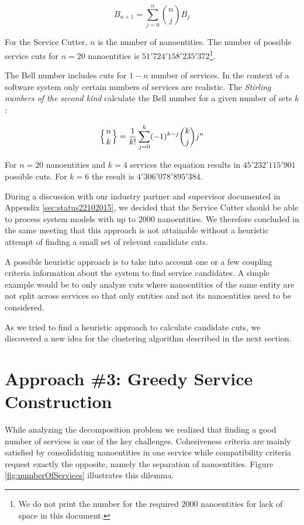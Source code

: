 \begin{displaymath}
B_{n+1}=\sum_{j=0}^n {n\choose j} B_j
\end{displaymath}

For the Service Cutter, $n$ is the number of nanoentities. The number of possible service cuts for $n=20$ nanoentities is $51'724'158'235'372$\footnote{We do not print the number for the required $2000$ nanoentities for lack of space in this document.}.

The Bell number includes cuts for $1 - n$ number of services. In the context of a software system only certain numbers of services are realistic. The \textit{Stirling numbers of the second kind} calculate the Bell number for a given number of sets $k$:

\begin{displaymath}
\left\{ {n \atop k}\right\} = \frac{1}{k!}\sum_{j=0}^{k} (-1)^{k-j} \binom{k}{j} j^n
\end{displaymath}

For $n=20$ nanoentities and $k=4$ services the equation results in $45'232'115'901$ possible cuts. For $k=6$ the result is $4'306'078'895'384$.

During a discussion with our industry partner and supervisor documented in Appendix \ref{sec:status22102015}, we decided that the Service Cutter should be able to process system models with up to 2000 nanoentities. We therefore concluded in the same meeting that this approach is not attainable without a heuristic attempt of finding a small set of relevant candidate cuts. 

A possible heuristic approach is to take into account one or a few coupling criteria information about the system to find service candidates. A simple example would be to only analyze cuts where nanoentities of the same entity are not split across services so that only entities and not its nanoentities need to be considered.

As we tried to find a heuristic approach to calculate candidate cuts, we discovered a new idea for the clustering algorithm described in the next section. 

\section{Approach \#3: Greedy Service Construction}

While analyzing the decomposition problem we realized that finding a good number of services is one of the key challenges. Cohesiveness criteria are mainly satisfied by consolidating nanoentities in one service while compatibility criteria request exactly the opposite, namely the separation of nanoentities. Figure \ref{fig:numberOfServices} illustrates this dilemma.


